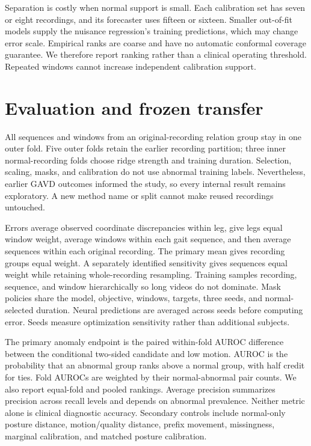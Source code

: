 \documentclass[letterpaper]{article}
\begin{document}
Separation is costly when normal support is small. Each calibration set has seven or eight recordings, and its forecaster uses fifteen or sixteen. Smaller out-of-fit models supply the nuisance regression's training predictions, which may change error scale. Empirical ranks are coarse and have no automatic conformal coverage guarantee. We therefore report ranking rather than a clinical operating threshold. Repeated windows cannot increase independent calibration support.

\section{Evaluation and frozen transfer}

All sequences and windows from an original-recording relation group stay in one outer fold. Five outer folds retain the earlier recording partition; three inner normal-recording folds choose ridge strength and training duration. Selection, scaling, masks, and calibration do not use abnormal training labels. Nevertheless, earlier GAVD outcomes informed the study, so every internal result remains exploratory. A new method name or split cannot make reused recordings untouched.

Errors average observed coordinate discrepancies within leg, give legs equal window weight, average windows within each gait sequence, and then average sequences within each original recording. The primary mean gives recording groups equal weight. A separately identified sensitivity gives sequences equal weight while retaining whole-recording resampling. Training samples recording, sequence, and window hierarchically so long videos do not dominate. Mask policies share the model, objective, windows, targets, three seeds, and normal-selected duration. Neural predictions are averaged across seeds before computing error. Seeds measure optimization sensitivity rather than additional subjects.

The primary anomaly endpoint is the paired within-fold AUROC difference between the conditional two-sided candidate and low motion. AUROC is the probability that an abnormal group ranks above a normal group, with half credit for ties. Fold AUROCs are weighted by their normal-abnormal pair counts. We also report equal-fold and pooled rankings. Average precision summarizes precision across recall levels and depends on abnormal prevalence. Neither metric alone is clinical diagnostic accuracy. Secondary controls include normal-only posture distance, motion/quality distance, prefix movement, missingness, marginal calibration, and matched posture calibration.
\end{document}

